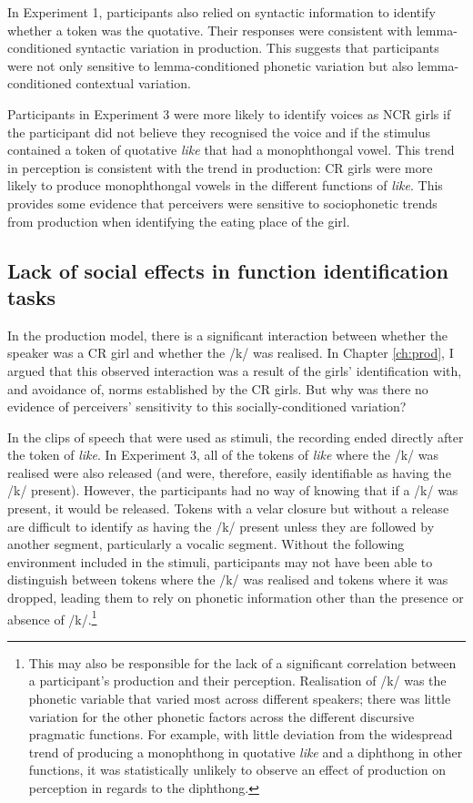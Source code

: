In Experiment 1, participants also relied on syntactic information to identify whether a token was the quotative.  Their responses were consistent with lemma-conditioned syntactic variation in production.  This suggests that participants were not only sensitive to lemma-conditioned phonetic variation but also lemma-conditioned contextual variation.

Participants in Experiment 3 were more likely to identify voices as NCR girls if the participant did not believe they recognised the voice and if the stimulus contained a token of quotative \textit{like} that had a monophthongal vowel.  This trend in perception is consistent with the trend in production: CR girls were more likely to produce monophthongal vowels in the different functions of \textit{like}.  This provides some evidence that perceivers were sensitive to sociophonetic trends from production when identifying the eating place of the girl.


\subsection{Lack of social effects in function identification tasks}

In the pro\-duction model, there is a signif\-icant inter\-action be\-tween whe\-ther the speaker was a CR girl and whether the /k/ was realised.  In Chapter \ref{ch:prod}, I argued that this observed interaction was a result of the girls' identification with, and avoidance of, norms established by the CR girls.  But why was there no evidence of perceivers' sensitivity to this socially-conditioned variation?

In the clips of speech that were used as stimuli, the recording ended directly after the token of \textit{like}.  In Experiment 3, all of the tokens of \textit{like} where the /k/ was realised were also released (and were, therefore, easily identifiable as having the /k/ present).  However, the participants had no way of knowing that if a /k/ was present, it would be released.  Tokens with a velar closure but without a release are difficult to identify as having the /k/ present unless they are followed by another segment, particularly a vocalic segment.  Without the following environment included in the stimuli, participants may not have been able to distinguish between tokens where the /k/ was realised and tokens where it was dropped, leading them to rely on phonetic information other than the presence or absence of /k/.\footnote{This may also be responsible for the lack of a significant correlation between a participant's production and their perception.  Realisation of /k/ was the phonetic variable that varied most across different speakers; there was little variation for the other phonetic factors across the different discursive pragmatic functions.  For example, with little deviation from the widespread trend of producing a monophthong in quotative \textit{like} and a diphthong in other functions, it was statistically unlikely to observe an effect of production on perception in regards to the diphthong.}

